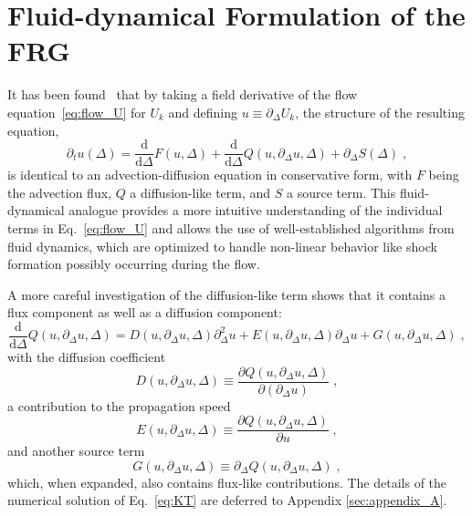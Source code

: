\documentclass[
onecolumn,
aps,
prd,
amsmath,
amssymb,
nofootinbib
]{revtex4-2}
\begin{document}
\section{Fluid-dynamical Formulation of the FRG}\label{sec:2}


It has been found~\cite{Grossi:2019urj,Koenigstein:2021syz} that by taking a field derivative of the flow equation~\eqref{eq:flow_U} for $U_k$ and defining $u \equiv \partial_\Delta U_k$, the structure of the resulting equation,
\begin{equation}
\label{eq:KT}
	\partial_t u(\Delta) = \frac{\mathrm{d}}{\mathrm{d}\Delta} F(u,\Delta) + \frac{\mathrm{d}}{\mathrm{d}\Delta} Q(u,\partial_\Delta u,\Delta) + \partial_\Delta S(\Delta)\;,
\end{equation}
is identical to an advection-diffusion equation in conservative form, with $F$ being the advection flux, $Q$ a diffusion-like term, and $S$ a source term. 
This fluid-dynamical analogue provides a more intuitive understanding of the individual terms in Eq.~\eqref{eq:flow_U} and allows the use of well-established algorithms from fluid dynamics, which are optimized to handle non-linear behavior like shock formation possibly occurring during the flow.

A more careful investigation of the diffusion-like term shows that it contains a flux component as well as a diffusion component:
\begin{equation}
\label{eq:decomp_Q}
	\frac{\mathrm{d}}{\mathrm{d}\Delta} Q(u,\partial_\Delta u,\Delta) =  D(u,\partial_\Delta u, \Delta)\partial^2_\Delta u + E(u,\partial_\Delta u, \Delta) \partial_\Delta u+ G(u,\partial_\Delta u, \Delta)\;,
\end{equation}
with the diffusion coefficient
\begin{equation}
	D(u,\partial_\Delta u, \Delta) \equiv \frac{\partial Q(u,\partial_\Delta u,\Delta)}{\partial (\partial_\Delta u)}\;,\label{eq:Diff_fkt}
\end{equation}
a contribution to the propagation speed
\begin{equation}
	E(u,\partial_\Delta u,\Delta) \equiv \frac{\partial Q(u,\partial_\Delta u,\Delta)}{\partial u}\;,
\end{equation}
and another source term
\begin{equation}
	G(u,\partial_\Delta u,\Delta) \equiv \partial_\Delta Q(u,\partial_\Delta u,\Delta)\;,
\end{equation}
which, when expanded, also contains flux-like contributions.
The details of the numerical solution of Eq.~\eqref{eq:KT} are deferred to Appendix \ref{sec:appendix_A}.
\end{document}
